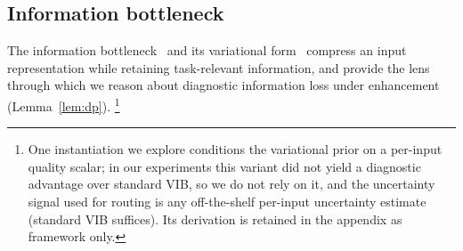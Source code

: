 \subsection{Information bottleneck}
\label{subsec:rel-ib}

The information bottleneck~\citep{tishby2000information} and its variational
form~\citep[VIB;][]{alemi2017deep} compress an input representation while
retaining task-relevant information, and provide the lens through which we
reason about diagnostic information loss under enhancement (Lemma~\ref{lem:dp}).%
\footnote{One instantiation we explore conditions the variational prior on a
per-input quality scalar; in our experiments this variant did not yield a
diagnostic advantage over standard VIB, so we do not rely on it, and the
uncertainty signal used for routing is any off-the-shelf per-input uncertainty
estimate (standard VIB suffices). Its derivation is retained in the appendix as
framework only.}
